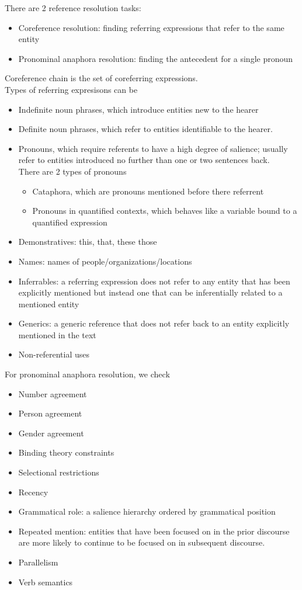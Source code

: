 \documentclass[12pt]{article}
\theoremstyle{definition}
\begin{document}
There are 2 reference resolution tasks:
\begin{itemize}
	\item Coreference resolution: finding referring expressions that refer to the same entity
	\item Pronominal anaphora resolution: finding the antecedent for a single pronoun
\end{itemize}
Coreference chain is the set of coreferring expressions.\\
Types of referring expresisons can be
\begin{itemize}
	\item Indefinite noun phrases, which introduce entities new to the hearer
	\item Definite noun phrases, which refer to entities identifiable to the hearer.
	\item Pronouns, which require referents to have a high degree of salience; usually refer to entities introduced no further than one or two sentences back.\\
	There are 2 types of pronouns
	\begin{itemize}
		\item Cataphora, which are pronouns mentioned before there referrent
		\item Pronouns in quantified contexts, which behaves like a variable bound to a quantified expression
	\end{itemize}
	\item Demonstratives: this, that, these those
	\item Names: names of people/organizations/locations
	\item Inferrables: a referring expression does not refer to any entity that has been explicitly mentioned but instead one that can be inferentially related to a mentioned entity
	\item Generics: a generic reference that does not refer back to an entity explicitly mentioned in the text
	\item Non-referential uses
\end{itemize}
For pronominal anaphora resolution, we check
\begin{itemize}
	\item Number agreement
	\item Person agreement
	\item Gender agreement
	\item Binding theory constraints
	\item Selectional restrictions
	\item Recency
	\item Grammatical role: a salience hierarchy ordered by grammatical position
	\item Repeated mention: entities that have been focused on in the prior discourse are more likely to continue to be focused on in subsequent discourse.
	\item Parallelism
	\item Verb semantics
\end{itemize}
\end{document}
